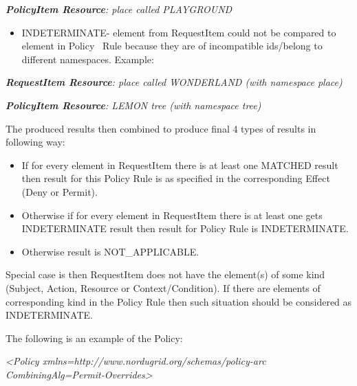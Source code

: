 \documentclass[a4paper]{article}
\newcommand\liststyleWWviiiNumxx{%
\renewcommand\theenumi{\arabic{enumi}}
\renewcommand\theenumii{\arabic{enumii}}
\renewcommand\theenumiii{\arabic{enumiii}}
\renewcommand\labelitemi{o}
\renewcommand\labelenumi{\theenumi.}
\renewcommand\labelenumii{\theenumii.}
\renewcommand\labelenumiii{\theenumiii.}
}
\begin{document}
{\upshape\color{black}
\foreignlanguage{english}{\textbf{\textit{PolicyItem
Resource}}}\foreignlanguage{english}{\textit{: place called
PLAYGROUND}}}

\liststyleWWviiiNumxx
\begin{itemize}
\item {\color{black}
INDETERMINATE- element from RequestItem could not be compared to element
in Policy \ Rule because they are of incompatible ids/belong to
different namespaces. Example:}
\end{itemize}
{\upshape\color{black}
\foreignlanguage{english}{\textbf{\textit{RequestItem
Resource}}}\foreignlanguage{english}{\textit{: place called WONDERLAND
(with namespace {\textquotedbl}place{\textquotedbl})}}}

{\upshape\color{black}
\foreignlanguage{english}{\textbf{\textit{PolicyItem
Resource}}}\foreignlanguage{english}{\textit{: LEMON tree (with
namespace {\textquotedbl}tree{\textquotedbl})}}}

{\color{black}
The produced results then combined to produce final 4 types of results
in following way:}

\liststyleWWviiiNumxx
\begin{itemize}
\item {\color{black}
If for every element in RequestItem there is at least one MATCHED result
then result for this Policy Rule is as specified in the corresponding
Effect (Deny or Permit).}
\item {\color{black}
Otherwise if for every element in RequestItem there is at least one gets
INDETERMINATE result then result for Policy Rule is INDETERMINATE.}
\item {\color{black}
Otherwise result is NOT\_APPLICABLE.}
\end{itemize}
{\color{black}
Special case is then RequestItem does not have the element(s) of some
kind (Subject, Action, Resource or Context/Condition). If there are
elements of corresponding kind in the Policy Rule then such situation
should be considered as INDETERMINATE.}

{\color{black}
The following is an example of the Policy:}

{\itshape\color{black}
{\textless}Policy
xmlns={\textquotedbl}http://www.nordugrid.org/schemas/policy-arc{\textquotedbl}
CombiningAlg={\textquotedbl}Permit-Overrides{\textquotedbl}{\textgreater}}
\end{document}
